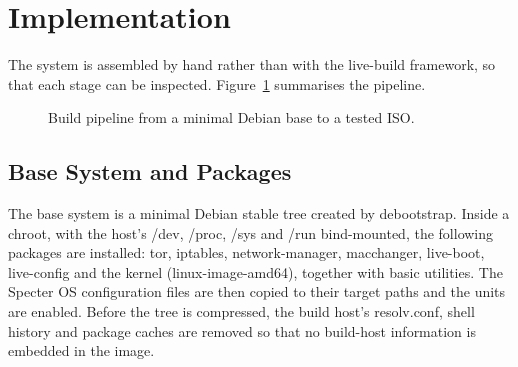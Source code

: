 \documentclass[10pt,twocolumn,a4paper]{article}
\DeclareRobustCommand{\texttt}[1]{\mbox{\ttfamily #1}}
\begin{document}
\section{Implementation}
\label{sec:impl}

The system is assembled by hand rather than with the
\texttt{live-build} framework, so that each stage can be inspected.
Figure~\ref{fig:build} summarises the pipeline.

\begin{figure}[t]
\centering
{}
\caption{Build pipeline from a minimal Debian base to a tested ISO.}
\label{fig:build}
\end{figure}

\subsection{Base System and Packages}
The base system is a minimal Debian stable tree created by
\texttt{debootstrap}. Inside a \texttt{chroot}, with the host's
\texttt{/dev}, \texttt{/proc}, \texttt{/sys} and \texttt{/run}
bind-mounted, the following packages are installed: \texttt{tor},
\texttt{iptables}, \texttt{network-manager}, \texttt{macchanger},
\texttt{live-boot}, \texttt{live-config} and the kernel
(\texttt{linux-image-amd64}), together with basic utilities. The Specter OS configuration
files are then copied to their target paths and the units are enabled.
Before the tree is compressed, the build host's \texttt{resolv.conf},
shell history and package caches are removed so that no build-host
information is embedded in the image.
\end{document}
